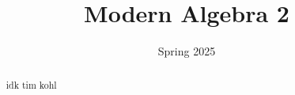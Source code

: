\documentclass[11pt, letterpaper]{report}
\title{Modern Algebra 2}
\date{Spring 2025}
\begin{document}
    \maketitle
    \begin{abstract}
    	idk tim kohl
    \end{abstract}
    \tableofcontents
    
    
    
    
    
    
    
    
    
    
    
    
    
    
    
    
    
    
\end{document}
